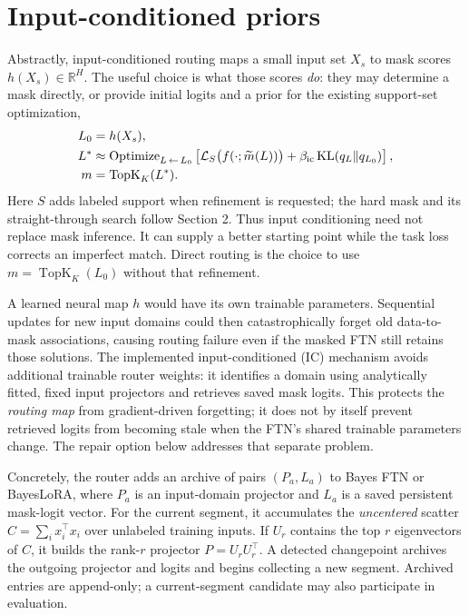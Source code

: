 \documentclass[11pt]{article}
\newcommand{\TopK}{\operatorname{TopK}}
\newcommand{\KL}{\operatorname{KL}}
\newcommand{\loss}{\mathcal{L}}
\begin{document}
\section{Input-conditioned priors}
Abstractly, input-conditioned routing maps a small input set $X_s$ to
mask scores $h(X_s)\in\mathbb{R}^H$. The useful choice is what those scores
\emph{do}: they may determine a mask directly, or provide initial logits and
a prior for the existing support-set optimization,
\begin{equation}
 \begin{aligned}
 L_0&=h(X_s),\\
 L^*&\approx\operatorname{Optimize}_{L\,\leftarrow\,L_0}
 \left[\loss_S\bigl(f(\cdot;\widetilde m(L))\bigr)
       +\beta_{\rm ic}\KL(q_L\Vert q_{L_0})\right],\\
 m&=\TopK_K(L^*).
 \end{aligned}
 \label{eq:ic-abstract}
\end{equation}
Here $S$ adds labeled support when refinement is requested; the hard mask
and its straight-through search follow Section 2. Thus input conditioning
need not replace mask inference. It can supply a better starting point while
the task loss corrects an imperfect match. Direct routing is the choice to
use $m=\TopK_K(L_0)$ without that refinement.

A learned neural map $h$ would have its own trainable parameters. Sequential
updates for new input domains could then catastrophically forget old
data-to-mask associations, causing routing failure even if the masked FTN
still retains those solutions. The implemented input-conditioned (IC)
mechanism avoids additional trainable router weights: it identifies a domain
using analytically fitted, fixed input projectors and retrieves saved mask
logits. This protects the \emph{routing map} from gradient-driven forgetting;
it does not by itself prevent retrieved logits from becoming stale when the
FTN's shared trainable parameters change. The repair option below addresses
that separate problem.

Concretely, the router adds an archive of pairs $(P_a,L_a)$ to Bayes FTN or
BayesLoRA, where $P_a$ is an input-domain projector and $L_a$ is a saved
persistent mask-logit vector. For the current segment, it accumulates the
\emph{uncentered} scatter
$C=\sum_i x_i^\top x_i$ over unlabeled training inputs. If $U_r$ contains
the top $r$ eigenvectors of $C$, it builds the rank-$r$ projector
$P=U_rU_r^\top$. A detected changepoint archives the outgoing projector
and logits and begins collecting a new segment. Archived entries are
append-only; a current-segment candidate may also participate in evaluation.
\end{document}

